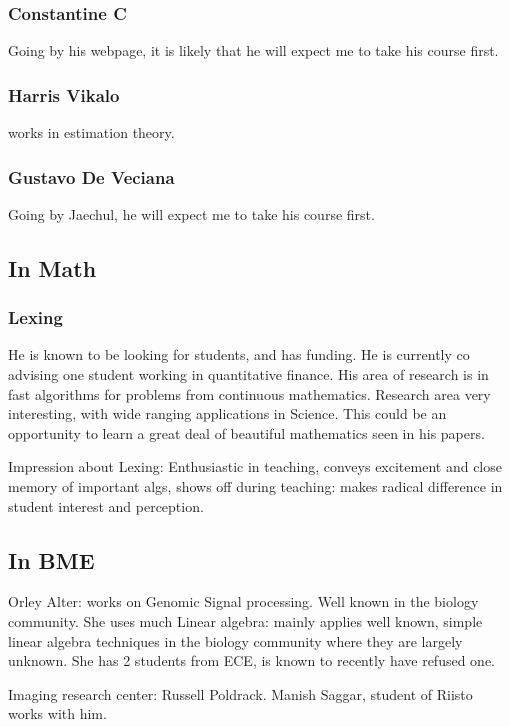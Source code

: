 \documentclass[oneside, article]{memoir}
\begin{document}
\subsubsection{Constantine C}
Going by his webpage, it is likely that he will expect me to take his course first.

\subsubsection{Harris Vikalo}
works in estimation theory.

\subsubsection{Gustavo De Veciana}
Going by Jaechul, he will expect me to take his course first.

\subsection{In Math}

\subsubsection{Lexing}

He is known to be looking for students, and has funding. He is currently co advising one student working in quantitative finance. His area of research is in fast algorithms for problems from continuous mathematics. Research area very interesting, with wide ranging applications in Science. This could be an opportunity to learn a great deal of beautiful mathematics seen in his papers.

\subitem Impression about Lexing: Enthusiastic in teaching, conveys excitement and close memory of important algs, shows off during teaching: makes radical difference in student interest and perception.

\subsection{In BME}

Orley Alter: works on Genomic Signal processing. Well known in the biology community. She uses much Linear algebra: mainly applies well known, simple linear algebra techniques in the biology community where they are largely unknown. She has 2 students from ECE, is known to recently have refused one.

Imaging research center: Russell Poldrack. Manish Saggar, student of Riisto works with him.
\end{document}
